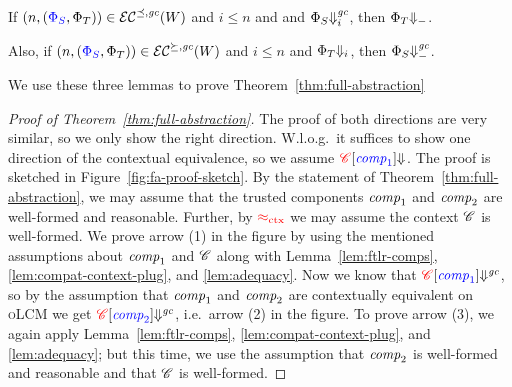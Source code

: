 \documentclass[acmsmall,review,anonymous]{acmart}\settopmatter{printfolios=true,printccs=false,printacmref=false}
\renewcommand{\nonExec}[1]{\plainfun{nonExec}{#1}}
\renewcommand{\comp}{\var{comp}}
\newcommand{\srccm}{\textsc{oLCM}}
\begin{document}
\begin{lemma}
  \label{lem:adequacy}
  If $\npair{\stpair{\Phi}{\Phi}}\in\lrec[\preceq,\gc](W)$ and
 $i \leq n$ and
and $\Phi_S \sterm[i]{\gc}$,
  then $\Phi_T\term$.

  Also, if
 $\npair{\stpair{\Phi}{\Phi}}\in\lrec[\succeq,\gc](W)$ and
 $i \leq n$
and $\Phi_T \term[i]$,
  then $\Phi_S\sterm{\gc}$.
\end{lemma}
We use these three lemmas to prove Theorem~\ref{thm:full-abstraction}
\begin{proof}[Proof of Theorem~\ref{thm:full-abstraction}]
  The proof of both directions are very similar, so we only show the right direction.
  W.l.o.g.\ it suffices to show one direction of the contextual equivalence, so we assume ${\plug{\trg{\context}}{\src{\comp_1}} \term[]{}}$.
  The proof is sketched in Figure~\ref{fig:fa-proof-sketch}.
  By the statement of Theorem~\ref{thm:full-abstraction}, we may assume that the trusted components $\comp_1$ and $\comp_2$ are well-formed and reasonable.
  Further, by $\tconeq$ we may assume the context $\context$ is well-formed.
  We prove arrow (1) in the figure by using the mentioned assumptions about $\comp_1$ and $\context$ along with Lemma~\ref{lem:ftlr-comps}, \ref{lem:compat-context-plug}, and \ref{lem:adequacy}.
  Now we know that ${\plug{\trg{\context}}{\src{\comp_1}} \sterm[]{\gc}{}}$, so by the assumption that $\comp_1$ and $\comp_2$ are contextually equivalent on \srccm{} we get ${\plug{\trg{\context}}{\src{\comp_2}} \sterm[]{\gc}{}}$, i.e.\ arrow (2) in the figure.
  To prove arrow (3), we again apply Lemma~\ref{lem:ftlr-comps}, \ref{lem:compat-context-plug}, and \ref{lem:adequacy}; but this time, we use the assumption that $\comp_2$ is well-formed and reasonable and that $\context$ is well-formed.
\end{proof}
\end{document}
